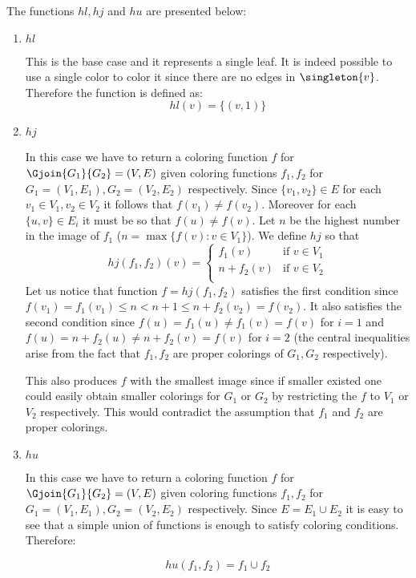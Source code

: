 The functions $hl, hj$ and $hu$ are presented below:
\begin{enumerate}
    \item $hl$

          This is the base case and it represents a single leaf. It is indeed possible to use a single color to color it since there are no edges in $\singleton{v}$. Therefore the function is defined as:
          \[
              hl(v) = \{(v,1)\}
          \]

    \item $hj$

          In this case we have to return a coloring function $f$ for $\Gjoin{G_1}{G_2} = (V,E)$ given coloring functions $f_1,f_2$ for $G_1 = (V_1, E_1), G_2 = (V_2, E_2)$ respectively. Since $\{v_1, v_2\} \in E$ for each $v_1 \in V_1, v_2 \in V_2$ it follows that $f(v_1) \neq f(v_2)$. Moreover for each $\{u,v\} \in E_i$ it must be so that $f(u) \neq f(v)$. Let $n$ be the highest number in the image of $f_1$ ($n = \max\{f(v) : v \in V_1\}$). We define $hj$ so that
          \[
              hj(f_1, f_2)(v) = \begin{cases}
                  f_1(v)     & \text{if } v \in V_1 \\
                  n + f_2(v) & \text{if } v \in V_2 \\
              \end{cases}
          \]
          Let us notice that function $f = hj(f_1, f_2)$ satisfies the first condition since $f(v_1) = f_1(v_1) \leq n < n+1 \leq n + f_2(v_2) = f(v_2)$. It also satisfies the second condition since $f(u) = f_1(u) \neq f_1(v) = f(v)$ for $i = 1$ and $f(u) = n + f_2(u) \neq n + f_2(v) = f(v)$ for $i = 2$ (the central inequalities arise from the fact that $f_1, f_2$ are proper colorings of $G_1, G_2$ respectively).

          This also produces $f$ with the smallest image since if smaller existed one could easily obtain smaller colorings for $G_1$ or $G_2$ by restricting the $f$ to $V_1$ or $V_2$ respectively. This would contradict the assumption that $f_1$ and $f_2$ are proper colorings.


    \item $hu$

          In this case we have to return a coloring function $f$ for $\Gjoin{G_1}{G_2} = (V,E)$ given coloring functions $f_1,f_2$ for $G_1 = (V_1, E_1), G_2 = (V_2, E_2)$ respectively. Since $E = E_1 \cup E_2$ it is easy to see that a simple union of functions is enough to satisfy coloring conditions. Therefore:

          \[
              hu(f_1, f_2) = f_1 \cup f_2
          \]
\end{enumerate}

